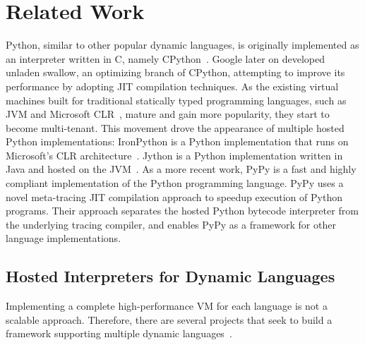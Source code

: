 \chapter{Related Work}
\label{chp:ch8-related-work}

Python, similar to other popular dynamic languages, is originally implemented as an interpreter written in C, namely CPython~\cite{python}.
Google later on developed unladen swallow, an optimizing branch of CPython, attempting to improve its performance by adopting JIT compilation techniques.
As the existing virtual machines built for traditional statically typed programming languages, such as JVM and Microsoft CLR~\cite{Kennedy+2001,Gough+2001,kilgore2002open}, mature and gain more popularity, they start to become multi-tenant.
This movement drove the appearance of multiple hosted Python implementations:
IronPython is a Python implementation that runs on Microsoft's CLR architecture~\cite{hugunin2004ironpython}.
Jython is a Python implementation written in Java and hosted on the JVM~\cite{jython}.
As a more recent work, PyPy\cite{Rigo2006,bolz.etal09,Bolz+2011,Bolz+alloc+2011,Bolz+2013,bolz.etal+15,Ardo+2012,Schneider+2012} is a fast and highly compliant implementation of the Python programming language.
PyPy uses a novel meta-tracing JIT compilation approach to speedup execution of Python programs.
Their approach separates the hosted Python bytecode interpreter from the underlying tracing compiler, and enables PyPy as a framework for other language implementations.

\section{Hosted Interpreters for Dynamic Languages}

Implementing a complete high-performance VM for each language is not a scalable approach.
Therefore, there are several projects that seek to build a framework supporting multiple dynamic languages~\cite{yermolovich.etal+09,Castanos+2012,Wimmer+modularity+2012}.

